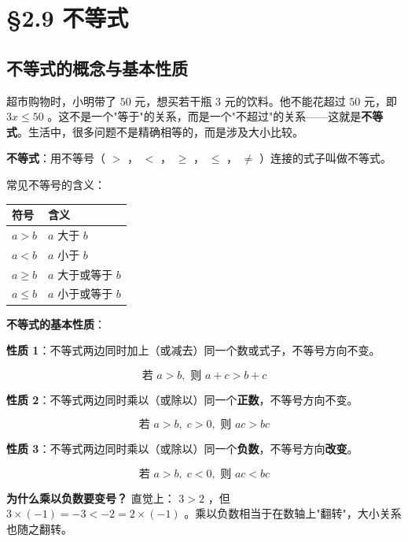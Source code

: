 \chapter{§2.9 不等式}
\label{sec:2.9}





\section*{不等式的概念与基本性质}


\begin{explore}


超市购物时，小明带了 $50$ 元，想买若干瓶 $3$ 元的饮料。他不能花超过 $50$ 元，即 $3x \leq 50$ 。这不是一个"等于"的关系，而是一个"不超过"的关系——这就是\textbf{不等式}。生活中，很多问题不是精确相等的，而是涉及大小比较。

\end{explore}

\begin{understand}


\textbf{不等式}：用不等号（ $>$ ， $<$ ， $\geq$ ， $\leq$ ， $\neq$ ）连接的式子叫做不等式。

常见不等号的含义：

\begin{center}
\begin{tabular}{ll}
\toprule
符号 & 含义 \\
\midrule
$a > b$ & $a$ 大于 $b$ \\
$a < b$ & $a$ 小于 $b$ \\
$a \geq b$ & $a$ 大于或等于 $b$ \\
$a \leq b$ & $a$ 小于或等于 $b$ \\
\bottomrule
\end{tabular}
\end{center}


\textbf{不等式的基本性质}：

\textbf{性质 1}：不等式两边同时加上（或减去）同一个数或式子，不等号方向不变。

\[
\text{若 } a > b, \text{ 则 } a + c > b + c
\]


\textbf{性质 2}：不等式两边同时乘以（或除以）同一个\textbf{正数}，不等号方向不变。

\[
\text{若 } a > b, \; c > 0, \text{ 则 } ac > bc
\]


\textbf{性质 3}：不等式两边同时乘以（或除以）同一个\textbf{负数}，不等号方向\textbf{改变}。

\[
\text{若 } a > b, \; c < 0, \text{ 则 } ac < bc
\]


\textbf{为什么乘以负数要变号？} 直觉上： $3 > 2$ ，但 $3 \times (-1) = -3 < -2 = 2 \times (-1)$ 。乘以负数相当于在数轴上"翻转"，大小关系也随之翻转。

\end{understand}

